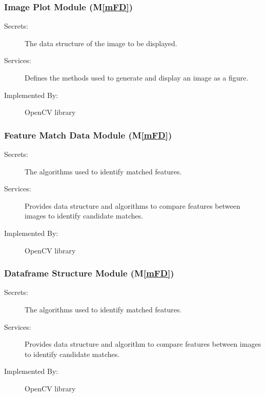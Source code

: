 \documentclass[12pt, titlepage]{article}
\newcommand{\mref}[1]{M\ref{#1}}
\begin{document}
\subsubsection{Image Plot Module (\mref{mFD})}
\begin{description}
\item[Secrets:] The data structure of the image to be displayed.
\item[Services:] Defines the methods used to generate and display an image as a figure.
\item[Implemented By:] OpenCV library
\end{description}

\subsubsection{Feature Match Data Module (\mref{mFD})}
\begin{description}
\item[Secrets:] The algorithms used to identify matched features.
\item[Services:] Provides data structure and algorithms to compare features between 
images to identify candidate matches. 
\item[Implemented By:] OpenCV library
\end{description}

\subsubsection{Dataframe Structure Module (\mref{mFD})}
\begin{description}
\item[Secrets:] The algorithms used to identify matched features.
\item[Services:] Provides data structure and algorithm to compare features 
between images to identify candidate matches. 
\item[Implemented By:] OpenCV library
\end{description}
\end{document}
